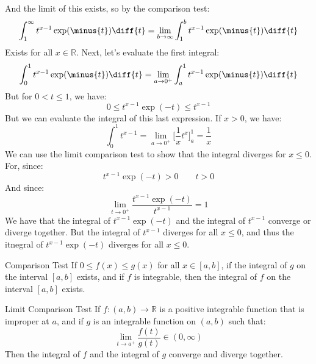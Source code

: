 \documentclass[crop=false,class=book,oneside]{standalone}
\begin{document}
        And the limit of this exists, so by the comparison test:
        \begin{equation}
            \int_{1}^{\infty}t^{x-1}\exp(\minus{t})\diff{t}=
            \underset{b\rightarrow\infty}{\lim}
            \int_{1}^{b}t^{x-1}\exp(\minus{t})\diff{t}
        \end{equation}
        Exists for all $x\in\mathbb{R}$. Next, let's evaluate the
        first integral:
        \begin{equation}
            \int_{0}^{1}t^{x-1}\exp(\minus{t})\diff{t}=
            \underset{a\rightarrow{0}^{+}}{\lim}
            \int_{a}^{1}t^{x-1}\exp(\minus{t})\diff{t}
        \end{equation}
        But for $0<t\leq{1}$, we have:
        \begin{equation}
            0\leq{t}^{x-1}\exp(\minus{t})\leq{t}^{x-1}
        \end{equation}
        But we can evaluate the integral of this last expression.
        If $x>0$, we have:
        \begin{equation}
            \int_{0}^{1}t^{x-1}=
            \underset{a\rightarrow{0}^{+}}{\lim}
            \Big[\frac{1}{x}t^{x}\Big]_{a}^{1}=\frac{1}{x}
        \end{equation}
        We can use the limit comparison test to show that the
        integral diverges for $x\leq{0}$. For, since:
        \begin{equation}
            t^{x-1}\exp(\minus{t})>0
            \quad\quad
            t>0
        \end{equation}
        And since:
        \begin{equation}
            \underset{t\rightarrow{0}^{+}}{\lim}
            \frac{t^{x-1}\exp(\minus{t})}{t^{x-1}}=1
        \end{equation}
        We have that the integral of $t^{x-1}\exp(\minus{t})$
        and the integral of $t^{x-1}$ converge or diverge together.
        But the integral of $t^{x-1}$ diverges for all $x\leq{0}$,
        and thus the itnegral of $t^{x-1}\exp(\minus{t})$ diverges
        for all $x\leq{0}$.
        \begin{ltheorem}{Comparison Test}
            If $0\leq{f}(x)\leq{g}(x)$ for all $x\in[a,b]$,
            if the integral of $g$ on the interval $[a,b]$ exists,
            and if $f$ is integrable, then the integral of
            $f$ on the interval $[a,b]$ exists.
        \end{ltheorem}
        \begin{ltheorem}{Limit Comparison Test}
            If $f:(a,b)\rightarrow\mathbb{R}$ is a positive
            integrable function that is improper at $a$, and if
            $g$ is an integrable function on $(a,b)$ such that:
            \begin{equation}
                \underset{t\rightarrow{a}^{+}}{\lim}
                \frac{f(t)}{g(t)}\in(0,\infty)
            \end{equation}
            Then the integral of $f$ and the integral of $g$
            converge and diverge together.
        \end{ltheorem}
\end{document}
